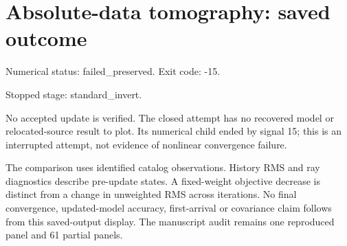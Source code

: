 \documentclass[11pt]{article}
\begin{document}
\section*{Absolute-data tomography: saved outcome}

Numerical status: failed\_preserved. Exit code: -15.

Stopped stage: standard\_invert.

No accepted update is verified. The closed attempt has no recovered model or relocated-source result to plot. Its numerical child ended by signal 15; this is an interrupted attempt, not evidence of nonlinear convergence failure.

The comparison uses identified catalog observations. History RMS and ray diagnostics describe pre-update states. A fixed-weight objective decrease is distinct from a change in unweighted RMS across iterations. No final convergence, updated-model accuracy, first-arrival or covariance claim follows from this saved-output display. The manuscript audit remains one reproduced panel and 61 partial panels.
\end{document}
